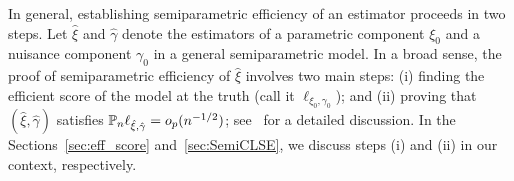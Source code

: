 {%
{In general, establishing semiparametric efficiency of an estimator proceeds in two steps. Let $\hat{\xi}$ and $\hat\gamma$ denote the estimators of a parametric component $\xi_0$ and a nuisance component $\gamma_0$ in a general semiparametric model. In a broad sense, the proof of semiparametric efficiency} of $\hat{\xi}$ involves two main steps: (i) finding the efficient score of the model at the truth (call it ${\ell}_{\xi_0, \gamma_0}$); and (ii) proving that $(\hat{\xi},\hat\gamma)$ satisfies $\mathbb{P}_n {\ell}_{\hat\xi, \hat\gamma} = o_p(n^{-1/2})$; see~\cite[pages 436-437]{VdV02} for a detailed discussion. In the Sections~\ref{sec:eff_score} and~\ref{sec:SemiCLSE}, we discuss steps (i) and (ii) in our context, respectively.


}
